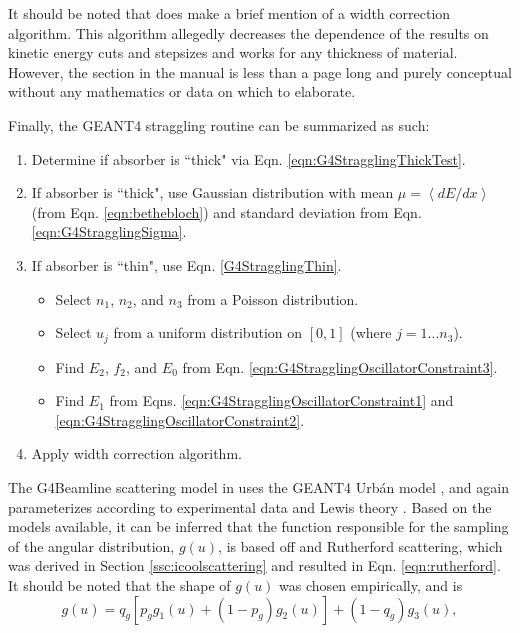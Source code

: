 It should be noted that \cite{geant4} does make a brief mention of a width correction algorithm. This algorithm allegedly decreases the dependence of the results on kinetic energy cuts and stepsizes and works for any thickness of material. However, the section in the manual is less than a page long and purely conceptual without any mathematics or data on which to elaborate.

Finally, the GEANT4 straggling routine can be summarized as such:
\begin{enumerate}
\item{Determine if absorber is ``thick" via Eqn. \ref{eqn:G4StragglingThickTest}.}
\item{If absorber is ``thick", use Gaussian distribution with mean $\mu = \left<dE/dx\right>$ (from Eqn. \ref{eqn:bethebloch}) and standard deviation from Eqn. \ref{eqn:G4StragglingSigma}.}
\item{If absorber is ``thin", use Eqn. \ref{G4StragglingThin}.
	\begin{itemize}
	\item{Select $n_1$, $n_2$, and $n_3$ from a Poisson distribution.}
	\item{Select $u_j$ from a uniform distribution on $[0,1]$ (where $j=1...n_3$).}
	\item{Find $E_2$, $f_2$, and $E_0$ from Eqn. \ref{eqn:G4StragglingOscillatorConstraint3}.} 
	\item{Find $E_1$ from Eqns. \ref{eqn:G4StragglingOscillatorConstraint1} and \ref{eqn:G4StragglingOscillatorConstraint2}.}
	\end{itemize}
	}
\item{Apply width correction algorithm.}
\end{enumerate}
 \label{sec:g4blscattering}\par
The G4Beamline scattering model in \cite{g4bl} uses the GEANT4 Urb\'{a}n model \cite{geant4}, and again parameterizes according to experimental data and Lewis theory \cite{lewis}. Based on the models available, it can be inferred that the function responsible for the sampling of the angular distribution, $g(u)$, is based off \cite{gs} and Rutherford scattering, which was derived in Section \ref{ssc:icoolscattering} and resulted in Eqn. \ref{eqn:rutherford}. It should be noted that the shape of $g(u)$ was chosen empirically, and is
%
\begin{equation}\label{eqn:g4blgu}
g(u)=q_g[p_g g_1(u)+(1-p_g)g_2(u)]+(1-q_g)g_3(u),
\end{equation}
